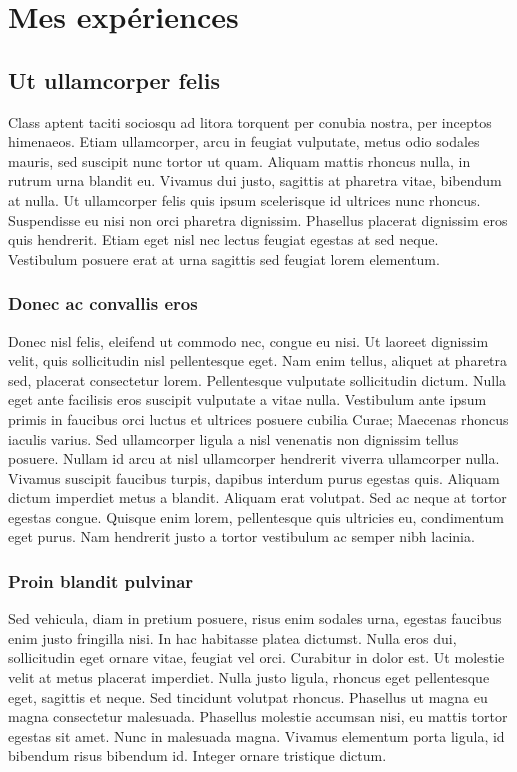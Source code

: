 \chapter{Mes expériences}\minitoc

\section{Ut ullamcorper felis}

 Class aptent taciti sociosqu ad litora torquent per conubia nostra, per inceptos himenaeos. Etiam ullamcorper, arcu in feugiat vulputate, metus odio sodales mauris, sed suscipit nunc tortor ut quam. Aliquam mattis rhoncus nulla, in rutrum urna blandit eu. Vivamus dui justo, sagittis at pharetra vitae, bibendum at nulla. Ut ullamcorper felis quis ipsum scelerisque id ultrices nunc rhoncus. Suspendisse eu nisi non orci pharetra dignissim. Phasellus placerat dignissim eros quis hendrerit. Etiam eget nisl nec lectus feugiat egestas at sed neque. Vestibulum posuere erat at urna sagittis sed feugiat lorem elementum.


\subsection{Donec ac convallis eros}

Donec nisl felis, eleifend ut commodo nec, congue eu nisi. Ut laoreet dignissim velit, quis sollicitudin nisl pellentesque eget. Nam enim tellus, aliquet at pharetra sed, placerat consectetur lorem. Pellentesque vulputate sollicitudin dictum. Nulla eget ante facilisis eros suscipit vulputate a vitae nulla. Vestibulum ante ipsum primis in faucibus orci luctus et ultrices posuere cubilia Curae; Maecenas rhoncus iaculis varius. Sed ullamcorper ligula a nisl venenatis non dignissim tellus posuere. Nullam id arcu at nisl ullamcorper hendrerit viverra ullamcorper nulla. Vivamus suscipit faucibus turpis, dapibus interdum purus egestas quis. Aliquam dictum imperdiet metus a blandit. Aliquam erat volutpat. Sed ac neque at tortor egestas congue. Quisque enim lorem, pellentesque quis ultricies eu, condimentum eget purus. Nam hendrerit justo a tortor vestibulum ac semper nibh lacinia. 

\subsection{Proin blandit pulvinar}

Sed vehicula, diam in pretium posuere, risus enim sodales urna, egestas faucibus enim justo fringilla nisi. In hac habitasse platea dictumst. Nulla eros dui, sollicitudin eget ornare vitae, feugiat vel orci. Curabitur in dolor est. Ut molestie velit at metus placerat imperdiet. Nulla justo ligula, rhoncus eget pellentesque eget, sagittis et neque. Sed tincidunt volutpat rhoncus. Phasellus ut magna eu magna consectetur malesuada. Phasellus molestie accumsan nisi, eu mattis tortor egestas sit amet. Nunc in malesuada magna. Vivamus elementum porta ligula, id bibendum risus bibendum id. Integer ornare tristique dictum. 

